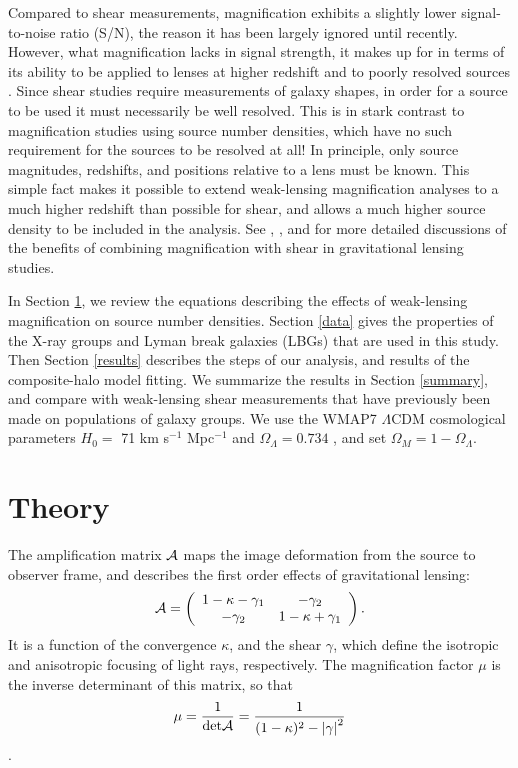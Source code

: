 \documentclass[iop]{emulateapj}
\begin{document}
Compared to shear measurements, magnification exhibits a slightly lower signal-to-noise ratio (S/N), the reason it has been largely ignored until recently. However, what magnification lacks in signal strength, it makes up for in terms of its ability to be applied to lenses at higher redshift and to poorly resolved sources \citep{Waerbeke10}. Since shear studies require measurements of galaxy shapes, in order for a source to be used it must necessarily be well resolved. This is in stark contrast to magnification studies using source number densities, which have no such requirement for the sources to be resolved at all! In principle, only source magnitudes, redshifts, and positions relative to a lens must be known. This simple fact makes it possible to extend weak-lensing magnification analyses to a much higher redshift than possible for shear, and allows a much higher source density to be included in the analysis.  See \citet{Waerbeke10}, \citet{RozoSchmidt10}, and \citet{Umetsu11} for more detailed discussions of the benefits of combining magnification with shear in gravitational lensing studies. 

In Section \ref{theory}, we review the equations describing the effects of weak-lensing magnification on source number densities. Section \ref{data} gives the properties of the X-ray groups and Lyman break galaxies (LBGs) that are used in this study. Then Section \ref{results} describes the steps of our analysis, and results of the composite-halo model fitting. We summarize the results in Section \ref{summary}, and compare with weak-lensing shear measurements that have previously been made on populations of galaxy groups. We use the WMAP7 $\Lambda$CDM cosmological parameters $H_0 =$ 71 km s$^{-1}$ Mpc$^{-1}$ and $\Omega_{\Lambda} = 0.734$ \citep{WMAP7}, and set $\Omega_M = 1 - \Omega_{\Lambda}$.

\section{Theory}
\label{theory}
The amplification matrix $\cal{A}$ maps the image deformation from the source to observer frame, and describes the first order effects of gravitational lensing:  
\begin{equation}
\cal{A} = \left( \begin{array}{cc}
{1-\kappa-\gamma_1} & {-\gamma_2} \\
{-\gamma_2} & {1-\kappa+\gamma_1} \\
\end{array} \right).
\end{equation}
It is a function of the convergence $\kappa$, and the shear $\gamma$, which define the isotropic and anisotropic focusing of light rays, respectively. The magnification factor $\mu$ is the inverse determinant of this matrix, so that
\begin{equation}
\mu = \frac{1}{\mathrm{det} \cal{A}} = 
\frac{1}{(1-\kappa)^2 - \left|\gamma\right|^2}
\end{equation}
\citep{BartelmannSchneider01}.  
\end{document}
